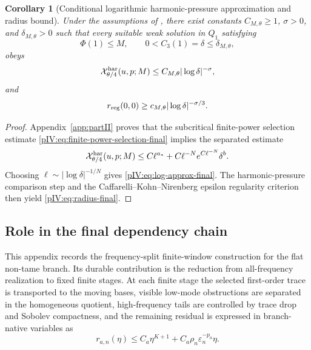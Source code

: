 \documentclass[11pt]{article}
\numberwithin{equation}{section}
\theoremstyle{plain}
\newtheorem{corollary}{Corollary}[section]
\theoremstyle{definition}
\theoremstyle{remark}
\newcommand{\calX}{\mathcal X}
\begin{document}
\begin{corollary}[Conditional logarithmic harmonic-pressure approximation and radius bound]
\label{pIV:cor:log-final}
Under the assumptions of , there exist constants \(C_{M,\theta}\ge1\), \(\sigma>0\), and
\(\delta_{M,\theta}>0\) such that every suitable weak solution in \(Q_1\) satisfying
\[
        \Phi(1)\le M,
        \qquad
        0<C_3(1)=\delta\le\delta_{M,\theta},
\]
obeys
\begin{equation}\label{pIV:eq:log-approx-final}
        \calX^{\rm har}_{\theta/4}(u,p;M)
        \le C_{M,\theta}|\log\delta|^{-\sigma},
\end{equation}
and
\begin{equation}\label{pIV:eq:radius-final}
        r_{\rm reg}(0,0)
        \ge c_{M,\theta}|\log\delta|^{-\sigma/3}.
\end{equation}
\end{corollary}

\begin{proof}
Appendix~\ref{app:partII} proves that the subcritical finite-power selection estimate
\eqref{pIV:eq:finite-power-selection-final} implies the separated estimate
\[
        \calX^{\rm har}_{\theta/4}(u,p;M)
        \le C\ell^{a_*}+C\ell^{-N}e^{C\ell^{-N}}\delta^b.
\]
Choosing \(\ell\sim |\log\delta|^{-1/N}\) gives \eqref{pIV:eq:log-approx-final}. The
harmonic-pressure comparison step and the Caffarelli--Kohn--Nirenberg epsilon
regularity criterion then yield \eqref{pIV:eq:radius-final}.
\end{proof}


\subsection{Role in the final dependency chain}
\label{pIV:sec:status}

This appendix records the frequency-split finite-window construction for the flat non-tame branch.  Its durable contribution is the reduction from all-frequency realization to fixed finite stages.  At each finite stage the selected first-order trace is transported to the moving bases, visible low-mode obstructions are separated in the homogeneous quotient, high-frequency tails are controlled by trace drop and Sobolev compactness, and the remaining residual is expressed in branch-native variables as
\[
        r_{a,n}(\eta)
        \le C_a\eta^{K+1}+C_a\rho_n\varepsilon_n^{-p_a}\eta .
\]
\end{document}
